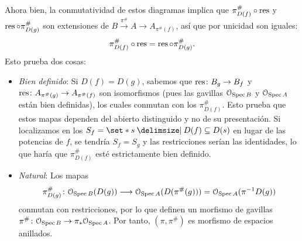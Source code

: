 \begin{sol}
Ahora bien, la conmutatividad de estos diagramas implica que $\pi^\#_{D(f)}\circ\operatorname{res}$ y $\operatorname{res}\circ\pi^\#_{D(g)}$ son extensiones de $B\xrightarrow{\pi^\#}A\to A_{\pi^\#(f)}$, así que por unicidad son iguales:
\[
\pi^\#_{D(f)}\circ\operatorname{res}=\operatorname{res}\circ\pi^\#_{D(g)}.
\]
Esto prueba dos cosas:
\begin{itemize}
\item \emph{Bien definido}: Si $D(f)=D(g)$, sabemos que $\operatorname{res}\colon B_g\to B_f$ y $\operatorname{res}\colon A_{\pi^\#(g)}\to A_{\pi^\#(f)}$ son isomorfismos (pues las gavillas $\mathcal O_{\operatorname{Spec} B}$ y $\mathcal O_{\operatorname{Spec} A}$ están bien definidas), los cuales conmutan con los $\pi^\#_{D(f)}$. Esto prueba que estos mapas dependen del abierto distinguido y no de su presentación. Si localizamos en los $S_f=\set*{s\given D(f)\subseteq D(s)}$ en lugar de las potencias de $f$, se tendría $S_f=S_g$ y las restricciones serían las identidades, lo que haría que $\pi^\#_{D(f)}$ esté estrictamente bien definido.

\item \emph{Natural}: Los mapas
\[
\pi^\#_{D(g)}\colon\mathcal O_{\operatorname{Spec} B}(D(g))
\longrightarrow\mathcal O_{\operatorname{Spec} A}(D(\pi^\#(g)))
=\mathcal O_{\operatorname{Spec} A}(\pi^{-1}D(g))
\]
conmutan con restricciones, por lo que definen un morfismo de gavillas $\pi^\#\colon\mathcal O_{\operatorname{Spec} B}\to\pi_*\mathcal O_{\operatorname{Spec} A}$. Por tanto, $(\pi,\pi^\#)$ es morfismo de espacios anillados.
\end{itemize}


\end{sol}
